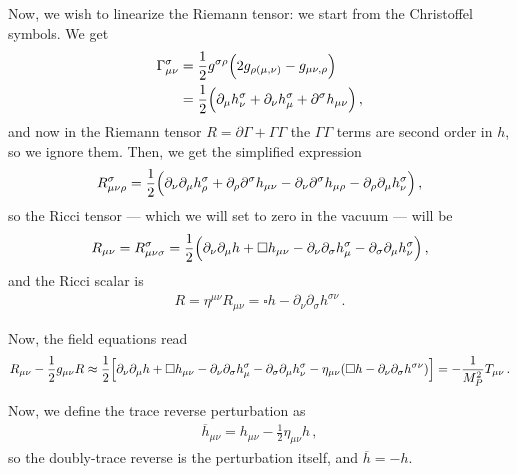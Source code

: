 \documentclass[main.tex]{subfiles}
\begin{document}
Now, we wish to linearize the Riemann tensor: we start from the Christoffel symbols. We get 
%
\begin{align}
\Gamma^{\sigma }_{\mu \nu }
&= \frac{1}{2} g^{\sigma \rho }\qty(2g_{\rho (\mu , \nu )} - g_{\mu \nu , \rho })  \\
&= \frac{1}{2} \qty(\partial_{\mu } h^{\sigma }_{\nu } + \partial_{\nu } h^{\sigma }_{\mu } + \partial^{\sigma } h_{\mu \nu })
\,,
\end{align}
%
and now in the Riemann tensor \(R = \partial \Gamma + \Gamma \Gamma \) the \(\Gamma \Gamma \) terms are second order in \(h\), so we ignore them. Then, we get the simplified expression 
%
\begin{align}
R^{\sigma }_{\mu \nu \rho } = \frac{1}{2} 
\qty(\partial_{\nu } \partial_{\mu } 
h^{\sigma }_{\rho } 
+ \partial_{\rho } \partial^{\sigma }h_{\mu \nu }
- \partial_{\nu } \partial^{\sigma } h_{\mu \rho }
- \partial_{\rho } \partial_{\mu } h^{\sigma }_{\nu })
\,,
\end{align}
%
so the Ricci tensor --- which we will  set to zero in the vacuum --- will be 
%
\begin{align}
R_{\mu \nu }
= R^{\sigma }_{\mu \nu \sigma }
= \frac{1}{2} 
\qty(\partial_{\nu } \partial_{\mu } h + \square h_{\mu \nu } 
- \partial_{\nu } \partial_{\sigma } h^{\sigma }_{\mu }
- \partial_{\sigma} \partial_{\mu } h^{\sigma }_{\nu })
\,,
\end{align}
%
and the Ricci scalar is 
%
\begin{align}
R = \eta^{\mu \nu } R_{\mu \nu } 
= \square h - \partial_{\nu }\partial_{\sigma } h^{\sigma \nu }
\,.
\end{align}

Now, the field equations read 
%
\begin{align}
R_{\mu \nu } - \frac{1}{2} g_{\mu \nu } R 
\approx \frac{1}{2} \qty[
  \partial_{\nu } \partial_{\mu } h + \square h_{\mu \nu } 
  - \partial_{\nu } \partial_{\sigma } h^{\sigma }_{\mu }
  - \partial_{\sigma} \partial_{\mu } h^{\sigma }_{\nu }
  - \eta_{\mu \nu }
  \qty(\square h - \partial_{\nu }\partial_{\sigma } h^{\sigma \nu })
] = - \frac{1}{M_P^2} T_{\mu \nu }
\,.
\end{align}

Now, we define the trace reverse perturbation as 
%
\begin{align}
\overline{h}_{\mu \nu } = h_{\mu \nu } - \frac{1}{2} \eta_{\mu \nu } h  
\,,
\end{align}
%
so the doubly-trace reverse is the perturbation itself, and \(\overline{h} = - h\). 
\end{document}
